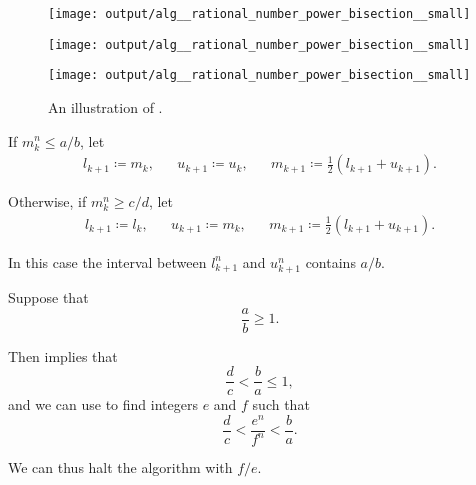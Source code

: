 \begin{algorithm}
\begin{thmenum}
\begin{thmenum}
      \begin{figure}[!ht]
        \begin{subcaptionblock}{\textwidth}
          \centering
          \texttt{[image: output/alg\_\_rational\_number\_power\_bisection\_\_small]}
        \end{subcaptionblock}

        \begin{subcaptionblock}{\textwidth}
          \centering
          \texttt{[image: output/alg\_\_rational\_number\_power\_bisection\_\_small]}
        \end{subcaptionblock}

        \begin{subcaptionblock}{\textwidth}
          \centering
          \texttt{[image: output/alg\_\_rational\_number\_power\_bisection\_\_small]}
        \end{subcaptionblock}

        \caption{An illustration of .}
        \label{fig:def:dedekind_cut}
      \end{figure}

      If \( m_k^n \leq a / b \), let
      \begin{align*}
        l_{k+1} \coloneqq m_k,
        &&
        u_{k+1} \coloneqq u_k,
        &&
        m_{k+1} \coloneqq \frac 1 2 (l_{k+1} + u_{k+1}).
      \end{align*}

      Otherwise, if \( m_k^n \geq c / d \), let
      \begin{align*}
        l_{k+1} \coloneqq l_k,
        &&
        u_{k+1} \coloneqq m_k,
        &&
        m_{k+1} \coloneqq \frac 1 2 (l_{k+1} + u_{k+1}).
      \end{align*}

      In this case the interval between \( l_{k+1}^n \) and \( u_{k+1}^n \) contains \( a / b \).
    \end{thmenum}

     Suppose that
    \begin{equation*}
      \frac a b \geq 1.
    \end{equation*}

    Then  implies that
    \begin{equation*}
      \frac d c < \frac b a \leq 1,
    \end{equation*}
    and we can use  to find integers \( e \) and \( f \) such that
    \begin{equation*}
      \frac d c < \frac {e^n} {f^n} < \frac b a.
    \end{equation*}

    We can thus halt the algorithm with \( f / e \).
  \end{thmenum}
\end{algorithm}
